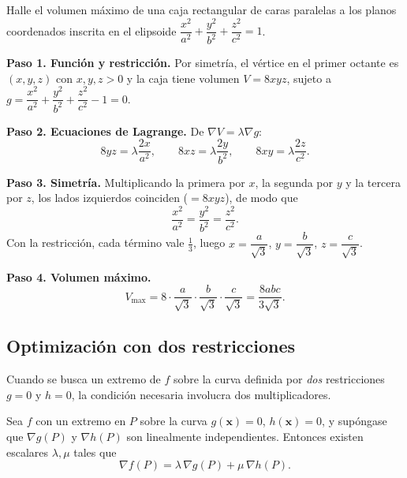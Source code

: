 \begin{example}
Halle el volumen máximo de una caja rectangular de caras paralelas a los
planos coordenados inscrita en el elipsoide
$\dfrac{x^2}{a^2}+\dfrac{y^2}{b^2}+\dfrac{z^2}{c^2}=1$.
\begin{myproof}
\textbf{Paso 1. Función y restricción.}
Por simetría, el vértice en el primer octante es $(x,y,z)$ con $x,y,z>0$ y la
caja tiene volumen $V=8xyz$, sujeto a
$g=\dfrac{x^2}{a^2}+\dfrac{y^2}{b^2}+\dfrac{z^2}{c^2}-1=0$.

\textbf{Paso 2. Ecuaciones de Lagrange.}
De $\nabla V=\lambda\nabla g$:
\[
  8yz=\lambda\frac{2x}{a^2},\qquad
  8xz=\lambda\frac{2y}{b^2},\qquad
  8xy=\lambda\frac{2z}{c^2}.
\]

\textbf{Paso 3. Simetría.}
Multiplicando la primera por $x$, la segunda por $y$ y la tercera por $z$, los
lados izquierdos coinciden ($=8xyz$), de modo que
\[
  \frac{x^2}{a^2}=\frac{y^2}{b^2}=\frac{z^2}{c^2}.
\]
Con la restricción, cada término vale $\tfrac13$, luego
$x=\dfrac{a}{\sqrt3}$, $y=\dfrac{b}{\sqrt3}$, $z=\dfrac{c}{\sqrt3}$.

\textbf{Paso 4. Volumen máximo.}
\[
  \boxed{\ V_{\max}=8\cdot\frac{a}{\sqrt3}\cdot\frac{b}{\sqrt3}\cdot
  \frac{c}{\sqrt3}=\frac{8abc}{3\sqrt3}.\ }
\]
\end{myproof}
\end{example}

\subsection{Optimización con dos restricciones}

Cuando se busca un extremo de $f$ sobre la curva definida por \emph{dos}
restricciones $g=0$ y $h=0$, la condición necesaria involucra dos
multiplicadores.

\begin{theorem}
Sea $f$ con un extremo en $P$ sobre la curva $g(\mathbf x)=0$,
$h(\mathbf x)=0$, y supóngase que $\nabla g(P)$ y $\nabla h(P)$ son
linealmente independientes. Entonces existen escalares $\lambda,\mu$ tales que
\[
  \nabla f(P)=\lambda\,\nabla g(P)+\mu\,\nabla h(P).
\]
\end{theorem}

